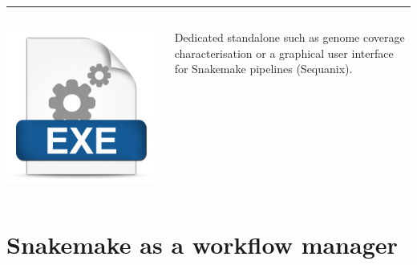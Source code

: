\documentclass{beamer}
\begin{document}
\begin{frame}
\rule{\textwidth}{1pt}


\begin{columns}
\begin{column}{1.5cm}
\includegraphics[height=0.2\textheight]{images/exe.png}
\end{column}
\begin{column}{9cm}
Dedicated standalone such as genome coverage characterisation or a graphical 
user interface for Snakemake pipelines (Sequanix).
\end{column}
\end{columns}



\end{frame}



\section{Snakemake as a workflow manager}
\end{document}
